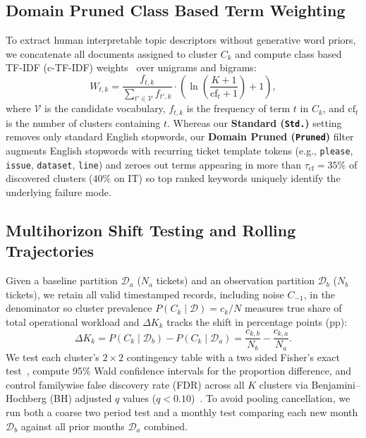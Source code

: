 \documentclass[sigconf,nonacm,pbalance]{acmart}
\begin{document}
\subsection{Domain Pruned Class Based Term Weighting}
To extract human interpretable topic descriptors without generative word priors, we concatenate all documents assigned to cluster $C_k$ and compute class based TF-IDF (c-TF-IDF) weights~\cite{grootendorst2022bertopic} over unigrams and bigrams:
\begin{equation}
\label{eq:ctfidf}
W_{t, k} = \frac{f_{t, k}}{\sum_{t' \in \mathcal{V}} f_{t', k}} \cdot \left( \ln \left( \frac{K + 1}{\text{cf}_t + 1} \right) + 1 \right),
\end{equation}
where $\mathcal{V}$ is the candidate vocabulary, $f_{t, k}$ is the frequency of term $t$ in $C_k$, and $\text{cf}_t$ is the number of clusters containing $t$. Whereas our \textbf{Standard (\texttt{Std.})} setting removes only standard English stopwords, our \textbf{Domain Pruned (\texttt{Pruned})} filter~\cite{hoyle2021automated, bianchi2021pre, grootendorst2022bertopic} augments English stopwords with recurring ticket template tokens (e.g., \texttt{please}, \texttt{issue}, \texttt{dataset}, \texttt{line}) and zeroes out terms appearing in more than $\tau_{\text{cf}} = 35\%$ of discovered clusters ($40\%$ on IT) so top ranked keywords uniquely identify the underlying failure mode.

\subsection{Multihorizon Shift Testing and Rolling Trajectories}
Given a baseline partition $\mathcal{D}_a$ ($N_a$ tickets) and an observation partition $\mathcal{D}_b$ ($N_b$ tickets), we retain all valid timestamped records, including noise $C_{-1}$, in the denominator so cluster prevalence $P(C_k \mid \mathcal{D}) = c_k / N$ measures true share of total operational workload and $\Delta K_k$ tracks the shift in percentage points (pp):
\begin{equation}
\label{eq:deltak}
\Delta K_k = P(C_k \mid \mathcal{D}_b) - P(C_k \mid \mathcal{D}_a) = \frac{c_{k, b}}{N_b} - \frac{c_{k, a}}{N_a}.
\end{equation}
We test each cluster's $2 \times 2$ contingency table with a two sided Fisher's exact test~\cite{fisher1922interpretation}, compute 95\% Wald confidence intervals for the proportion difference, and control familywise false discovery rate (FDR) across all $K$ clusters via Benjamini--Hochberg (BH) adjusted $q$ values ($q < 0.10$)~\cite{benjamini1995controlling}. To avoid pooling cancellation, we run both a coarse two period test and a monthly test comparing each new month $\mathcal{D}_b$ against all prior months $\mathcal{D}_a$ combined.
\end{document}
